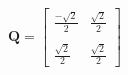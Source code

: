 \documentclass[preview]{standalone}
\begin{document}
\begin{align*}
\mathbf{Q} = \begin{bmatrix}\frac{-\sqrt{2}}{2} & \frac{\sqrt{2}}{2} \\ \\\frac{\sqrt{2}}{2} & \frac{\sqrt{2}}{2}\end{bmatrix}
\end{align*}
\end{document}
